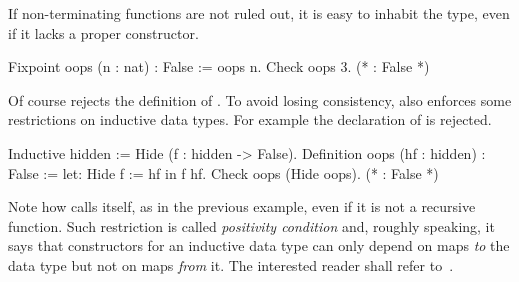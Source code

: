 If non-terminating functions are not ruled out, it is easy to inhabit
the  type, even if it lacks a proper constructor.

\begin{coq}{}{}
Fixpoint oops (n : nat) : False := oops n.
Check oops 3.  (* : False *)
\end{coq}
Of course \Coq{} rejects the definition of .  To avoid
losing consistency, \Coq{} also enforces some restrictions on
inductive data types.  For example the declaration of 
is rejected.

\begin{coq}{}{}
Inductive hidden := Hide (f : hidden -> False).
Definition oops (hf : hidden) : False := let: Hide f := hf in f hf.
Check oops (Hide oops).  (* : False *)
\end{coq}
Note how  calls itself, as in the previous example,
even if it is not a recursive function.
Such restriction is called
\emph{positivity condition} and,
roughly speaking, it says that constructors for an inductive data
type can only depend on maps \emph{to} the data type but not on maps
\emph{from} it.
The interested reader shall refer to~\cite{Coq:manual}.




